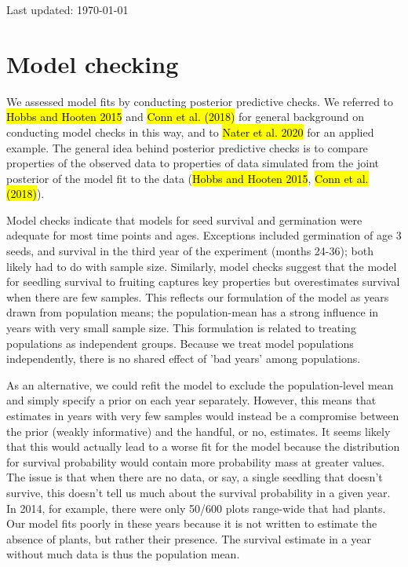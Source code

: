 \documentclass[12pt, oneside, titlepage]{article}   	%
\begin{document}
 

Last updated: \today

\section*{Model checking}

We assessed model fits by conducting posterior predictive checks. We referred to \hl{Hobbs and Hooten 2015}  and \hl{Conn et al. (2018)} for general background on conducting model checks in this way, and to \hl{Nater et al. 2020} for an applied example. The general idea behind posterior predictive checks is to compare properties of the observed data to properties of data simulated from the joint posterior of the model fit to the data (\hl{Hobbs and Hooten 2015}, \hl{Conn et al. (2018)}). 

Model checks indicate that models for seed survival and germination were adequate for most time points and ages. Exceptions included germination of age 3 seeds, and survival in the third year of the experiment (months 24-36); both likely had to do with sample size. Similarly, model checks suggest that the model for seedling survival to fruiting captures key properties but overestimates survival when there are few samples. This reflects our formulation of the model as years drawn from population means; the population-mean has a strong influence in years with very small sample size. This formulation is related to treating populations as independent groups. Because we treat model populations independently, there is no shared effect of 'bad years' among populations. 

As an alternative, we could refit the model to exclude the population-level mean and simply specify a prior on each year separately. However, this means that estimates in years with very few samples would instead be a compromise between the prior (weakly informative) and the handful, or no, estimates. It seems likely that this would actually lead to a worse fit for the model because the distribution for survival probability would contain more probability mass at greater values. The issue is that when there are no data, or say, a single seedling that doesn't survive, this doesn't tell us much about the survival probability in a given year. In 2014, for example, there were only 50/600 plots range-wide that had plants. Our model fits poorly in these years because it is not written to estimate the absence of plants, but rather their presence. The survival estimate in a year without much data is thus the population mean.
\end{document}
